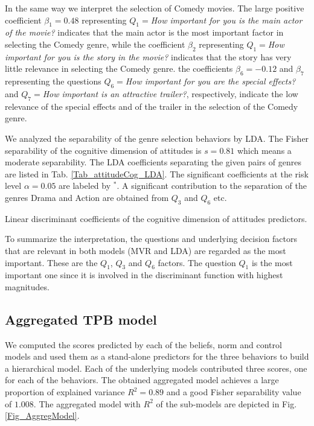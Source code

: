 \documentclass{llncs}
\def\a{{\alpha}}
\def\b{{\beta}}
\begin{document}
In the same way we interpret the selection of Comedy movies. The large positive coefficient $\b_1=0.48$ representing $Q_1=${\it How important for you is the main actor of the movie?} indicates that the main actor is the most important factor in selecting the Comedy genre, while the coefficient $\b_2$ representing $Q_1=${\it How important for you is the story in the movie?} indicates that the story has very little relevance in selecting the Comedy genre. the coefficients $\b_6=-0.12$ and $\b_7$ representing the questions $Q_6=${\it How important for you are the special effects?} and $Q_7=${\it How important is an attractive trailer?}, respectively, indicate the low relevance of the special effects and of the trailer in the selection of the Comedy genre. 

We analyzed the separability of the genre selection behaviors by LDA. The Fisher separability of the cognitive dimension of attitudes is $s = 0.81$ which means a moderate separability. The LDA coefficients separating the given pairs of genres are listed in Tab. \ref{Tab_attitudeCog_LDA}. The significant coefficients at the risk level $\a=0.05$ are labeled by $^*$. A significant contribution to the separation of the genres Drama and Action are obtained from $Q_3$ and $Q_6$ etc. 

\vspace*{-0.5em}
\begin{table}[!h]
  \centering
   
  \caption{Linear discriminant coefficients of the cognitive dimension of attitudes predictors.}
  \label{Tab_attitudeCog_LDA}
\end{table}
\vspace*{-0.5em}

To summarize the interpretation, the questions and underlying decision factors that are relevant in both models (MVR and LDA) are regarded as the most important. These are the $Q_1$, $Q_3$ and $Q_6$ factors. The question $Q_1$ is the most important one since it is involved in the discriminant function with highest magnitudes. 

\subsection{Aggregated TPB model}\label{SubSec_AggregateModel}

We computed the scores predicted by each of the beliefs, norm and control models and used them as a stand-alone predictors for the three behaviors to build a hierarchical model. Each of the underlying models contributed three scores, one for each of the behaviors. The obtained aggregated model achieves a large proportion of explained variance $R^2=0.89$ and a good Fisher separability value of $1.008$. The aggregated model with $R^2$ of the sub-models are depicted in Fig. \ref{Fig_AggregModel}. 
\end{document}
